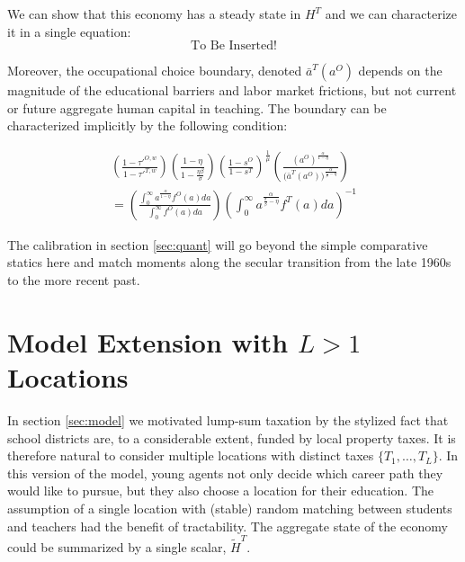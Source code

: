 \documentclass[onehalfspacing,11pt]{article}
\begin{document}
We can show that this economy has a steady state in $H^T$ and we can characterize it in a single equation:
\begin{equation}
\label{ }
\textrm{To Be Inserted!}
\end{equation}

Moreover, the occupational choice boundary, denoted $\bar{a}^T(a^O)$ depends on the magnitude of the educational barriers and labor market frictions, but not current or future aggregate human capital in teaching. The boundary can be characterized implicitly by the following condition:

\begin{eqnarray}
\label{eq:occChoice}
\left(\frac{1-{\tau'}^{O,w}}{1-{\tau'}^{T,w}}\right) \left(\frac{1-\eta}{1-\tfrac{\eta\beta}{\sigma}}\right)  \left(\frac{1-s^{O}}{1-s^{T}}\right)^{\frac{1}{\mu}}  \left(\frac{(a^O)^\frac{\alpha}{1-\eta}}{\big({\bar{a}^T(a^O)}\big)^\frac{\alpha}{\frac{\sigma}{\beta}-\eta}} \right) \nonumber \\
= \left(\frac{\int_0^\infty a^\frac{\alpha}{1-\eta} {f^O(a)} da}{\int_0^\infty {f^O(a)} da} \right) \left(\int_0^\infty a^\frac{\alpha}{\frac{\sigma}{\beta}-\eta} {f^T(a)} da\right)^{-1} 
\end{eqnarray}


The calibration in section \ref{sec:quant} will go beyond the simple comparative statics here and match moments along the secular transition from the late 1960s to the more recent past.

\section{Model Extension with $L > 1$ Locations}
In section \ref{sec:model} we motivated lump-sum taxation by the stylized fact that school districts are, to a considerable extent, funded by local property taxes. It is therefore natural to consider multiple locations with distinct taxes $\{T_1,\ldots,T_L\}$. In this version of the model, young agents not only decide which career path they would like to pursue, but they also choose a location for their education. %
The assumption of a single location with (stable) random matching between students and teachers had the benefit of tractability. The aggregate state of the economy could be summarized by a single scalar, $ \widetilde{H}^{T}$.
\end{document}
